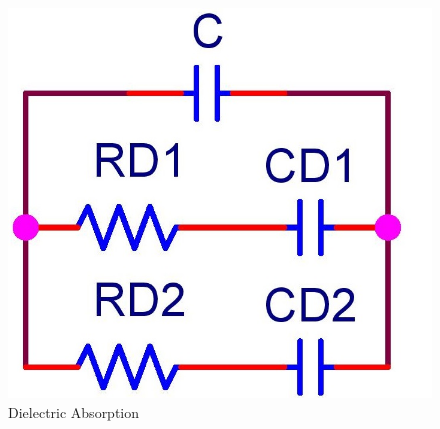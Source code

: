 \begin{figure}[ht!]
\includegraphics[keepaspectratio=true,scale=.5]{./figures/parameters/dieAbsorption.jpg}
\centering
\caption{Dielectric Absorption}
\label{fig:dieAbsorption}
\end{figure}
